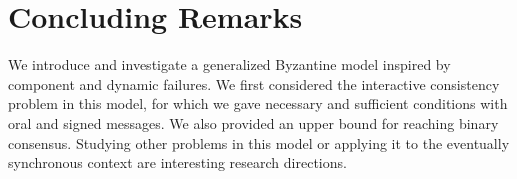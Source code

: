 
\section{Concluding Remarks}

We introduce and investigate a generalized Byzantine model inspired by component and dynamic failures. We first considered the interactive
consistency problem in this model, for which we gave 
necessary and sufficient conditions with
oral and signed messages. We also provided an upper bound for reaching binary consensus. 
Studying other problems in this model or applying it to the eventually synchronous 
context are interesting research directions. 


